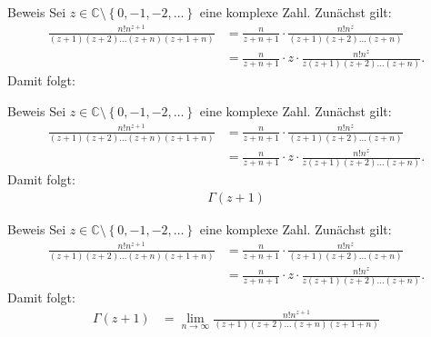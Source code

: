 \documentclass[10pt]{beamer}
\def\bC{\mathbb{C}}
\begin{document}
\begin{frame}{Beweis}
    Sei \( z \in \bC \setminus \left\{ 0, -1, -2, \ldots \right\} \) eine komplexe Zahl. Zunächst gilt:
    \begin{align*}
        \frac{n! n^{z + 1}}{\left( z + 1 \right) \left( z + 2 \right) \ldots \left( z + n \right) \left( z + 1 + n \right)}
        & = \frac{n}{z + n + 1} \cdot \frac{n! n^{z}}{\left( z + 1 \right) \left( z + 2 \right) \ldots \left( z + n \right)} \\
        & = \frac{n}{z + n + 1} \cdot z \cdot \frac{n! n^{z}}{z \left( z + 1 \right) \left( z + 2 \right) \ldots \left( z + n \right)}.
    \end{align*}
    Damit folgt:
\end{frame}



\begin{frame}{Beweis}
    Sei \( z \in \bC \setminus \left\{ 0, -1, -2, \ldots \right\} \) eine komplexe Zahl. Zunächst gilt:
    \begin{align*}
        \frac{n! n^{z + 1}}{\left( z + 1 \right) \left( z + 2 \right) \ldots \left( z + n \right) \left( z + 1 + n \right)}
        & = \frac{n}{z + n + 1} \cdot \frac{n! n^{z}}{\left( z + 1 \right) \left( z + 2 \right) \ldots \left( z + n \right)} \\
        & = \frac{n}{z + n + 1} \cdot z \cdot \frac{n! n^{z}}{z \left( z + 1 \right) \left( z + 2 \right) \ldots \left( z + n \right)}.
    \end{align*}
    Damit folgt:
    \begin{align*}
        \Gamma\left( z + 1 \right)
    \end{align*}
\end{frame}



\begin{frame}{Beweis}
    Sei \( z \in \bC \setminus \left\{ 0, -1, -2, \ldots \right\} \) eine komplexe Zahl. Zunächst gilt:
    \begin{align*}
        \frac{n! n^{z + 1}}{\left( z + 1 \right) \left( z + 2 \right) \ldots \left( z + n \right) \left( z + 1 + n \right)}
        & = \frac{n}{z + n + 1} \cdot \frac{n! n^{z}}{\left( z + 1 \right) \left( z + 2 \right) \ldots \left( z + n \right)} \\
        & = \frac{n}{z + n + 1} \cdot z \cdot \frac{n! n^{z}}{z \left( z + 1 \right) \left( z + 2 \right) \ldots \left( z + n \right)}.
    \end{align*}
    Damit folgt:
    \begin{align*}
        \Gamma\left( z + 1 \right)
        & = \lim_{n \to \infty} \frac{n! n^{z + 1}}{\left( z + 1 \right) \left( z + 2 \right) \ldots \left( z + n \right) \left( z + 1 + n \right)}
    \end{align*}
\end{frame}
\end{document}
